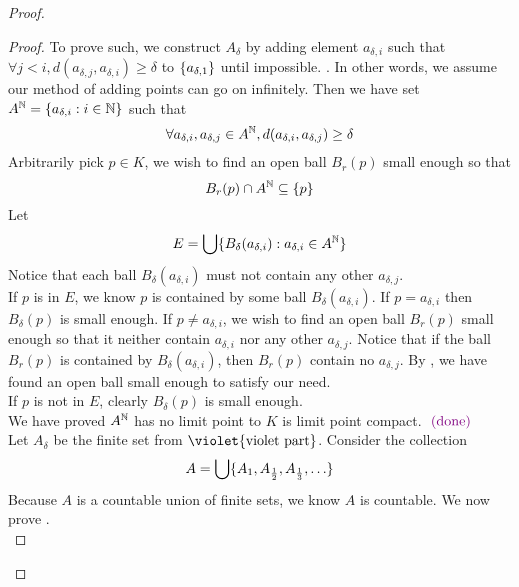 \documentclass{report}
\begin{document}
\begin{proof}
\begin{proof}
To prove such, we construct $A_\delta$ by adding element $a_{\delta,i}$ such that $\forall j<i, d(a_{\delta, j},a_{\delta ,i})\geq \delta$ to $\{ a_{\delta ,1} \}$ until impossible. . In other words, we assume our method of adding points can go on infinitely. Then we have set $A^{\mathbb{N}}=\{ a_{\delta,i}:i\in\mathbb{N} \}$ such that
\begin{equation}
\forall a_{\delta,i},a_{\delta,j}\in A^{\mathbb{N}}, d(a_{\delta, i},a_{\delta , j})\geq \delta
\end{equation}
Arbitrarily pick $p\in  K$, we wish to find an open ball $B_r(p)$ small enough so that
\begin{equation}
B_r(p)\cap A^{\mathbb{N}}\subseteq \{ p \}
\end{equation}
Let
\begin{equation}
E=\bigcup \{ B_\delta(a_{\delta,i}):a_{\delta,i}\in A^{\mathbb{N}} \}
\end{equation}
Notice that each ball $B_{\delta}(a_{\delta,i})$ must not contain any other $a_{\delta,j}$.\\

If $p$ is in $E$, we know $p$ is contained by some ball  $B_{\delta}(a_{\delta,i})$. If $p=a_{\delta,i}$  then $B_{\delta}(p)$ is small enough. If $p\neq a_{\delta,i}$, we wish to find an open ball $B_r(p)$ small enough so that it neither contain $a_{\delta,i}$ nor any other $a_{\delta,j}$. Notice that if the ball $B_r(p)$ is contained by $B_\delta(a_{\delta,i})$, then $B_r(p)$ contain no $a_{\delta,j}$. By , we have found an open ball small enough to satisfy our need.\\

If $p$ is not in $E$, clearly $B_{\delta}(p)$ is small enough.\\

We have proved $A^{\mathbb{N}}$ has no limit point \CaC to $K$ is limit point compact. $\textcolor{violet}{\text{ (done) }}$\\

Let $A_\delta$ be the finite set from $\violet{\text{violet part}}$. Consider the collection 
\begin{equation}
A=\bigcup \set{A_1,A_{\frac{1}{2}},A_{\frac{1}{3}},\dots}
\end{equation}
Because $A$ is a countable union of finite sets, we know $A$ is countable. We now prove .\\



\end{proof}
\end{proof}
\end{document}
